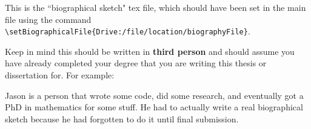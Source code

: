 This is the ``biographical sketch" tex file, which should have been set in the main file using the command \verb|\setBiographicalFile{Drive:/file/location/biographyFile}|.

Keep in mind this should be written in \textbf{third person} and should assume you have already completed your degree that you are writing this thesis or dissertation for. 
For example:

Jason is a person that wrote some code, did some research, and eventually got a PhD in mathematics for some stuff. He had to actually write a real biographical sketch because he had forgotten to do it until final submission.